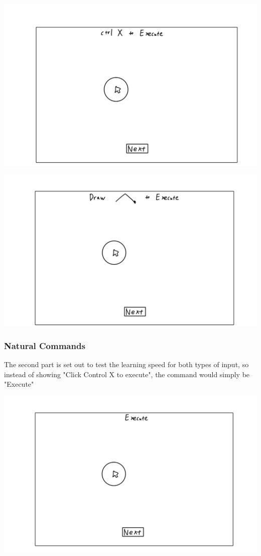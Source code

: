 \documentclass[12pt]{article}
\begin{document}
\includegraphics[scale=0.15]{click.jpg}

\includegraphics[scale=0.15]{draw.jpg}

\subsubsection{Natural Commands}
The second part is set out to test the learning speed for both types of input, so instead of showing "Click Control X to execute", the command would simply be "Execute"

\includegraphics[scale=0.15]{x.jpg}
\end{document}
